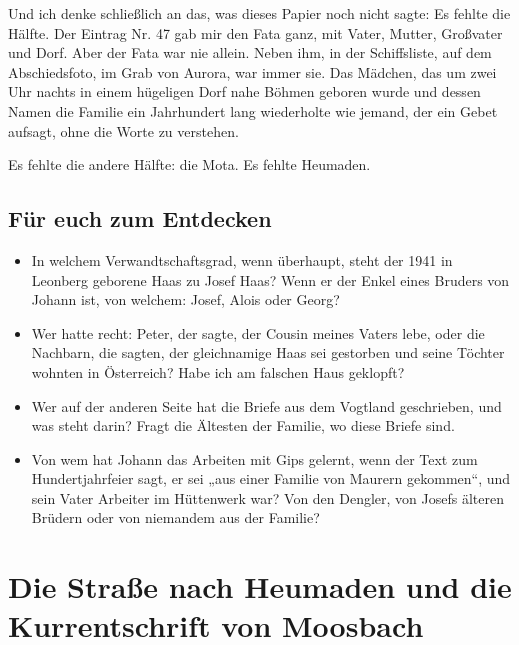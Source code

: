 \documentclass[
  ngerman,
  11pt,
  openany]{book}
\providecommand{\tightlist}{%
  \setlength{\itemsep}{0pt}\setlength{\parskip}{0pt}}
\begin{document}
Und ich denke schließlich an das, was dieses Papier noch nicht sagte: Es
fehlte die Hälfte. Der Eintrag Nr. 47 gab mir den Fata ganz, mit Vater,
Mutter, Großvater und Dorf. Aber der Fata war nie allein. Neben ihm, in
der Schiffsliste, auf dem Abschiedsfoto, im Grab von Aurora, war immer
sie. Das Mädchen, das um zwei Uhr nachts in einem hügeligen Dorf nahe
Böhmen geboren wurde und dessen Namen die Familie ein Jahrhundert lang
wiederholte wie jemand, der ein Gebet aufsagt, ohne die Worte zu
verstehen.

Es fehlte die andere Hälfte: die Mota. Es fehlte Heumaden.

\section{Für euch zum Entdecken}\label{fuxfcr-euch-zum-entdecken-16}

\begin{itemize}
\tightlist
\item
  In welchem Verwandtschaftsgrad, wenn überhaupt, steht der 1941 in
  Leonberg geborene Haas zu Josef Haas? Wenn er der Enkel eines Bruders
  von Johann ist, von welchem: Josef, Alois oder Georg?
\item
  Wer hatte recht: Peter, der sagte, der Cousin meines Vaters lebe, oder
  die Nachbarn, die sagten, der gleichnamige Haas sei gestorben und
  seine Töchter wohnten in Österreich? Habe ich am falschen Haus
  geklopft?
\item
  Wer auf der anderen Seite hat die Briefe aus dem Vogtland geschrieben,
  und was steht darin? Fragt die Ältesten der Familie, wo diese Briefe
  sind.
\item
  Von wem hat Johann das Arbeiten mit Gips gelernt, wenn der Text zum
  Hundertjahrfeier sagt, er sei „aus einer Familie von Maurern
  gekommen``, und sein Vater Arbeiter im Hüttenwerk war? Von den
  Dengler, von Josefs älteren Brüdern oder von niemandem aus der
  Familie?
\end{itemize}

\chapter{Die Straße nach Heumaden und die Kurrentschrift von
Moosbach}\label{cap-18}
\end{document}
